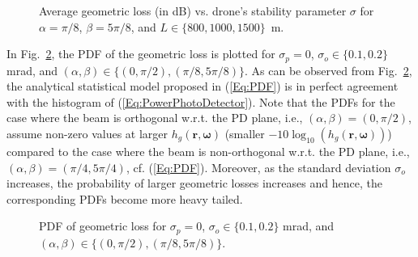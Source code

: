 \documentclass[conference]{IEEEtran}
\begin{document}
 
\begin{figure}
  \centering
\vspace{-8mm}
\caption{Average geometric loss (in dB) vs. drone's stability parameter $\sigma$ for $\alpha=\pi/8$, $\beta=5\pi/8$,  and  $L\in\{800,1000,1500\}$~m.  } \vspace{-2mm}
\label{Fig:Stat}
\end{figure}


 In Fig.~\ref{Fig:PDF}, the PDF of the geometric loss is plotted for $\sigma_p=0$, $\sigma_o\in\{0.1,0.2\}$ mrad, and $(\alpha,\beta)\in\{(0,\pi/2),(\pi/8,5\pi/8)\}$. As can be observed from Fig.~\ref{Fig:PDF}, the  analytical statistical model proposed in (\ref{Eq:PDF}) is in perfect agreement with the histogram of (\ref{Eq:PowerPhotoDetector}). Note that the PDFs for the case where the beam is orthogonal w.r.t. the PD plane, i.e., $(\alpha,\beta)=(0,\pi/2)$, assume non-zero values at larger $h_g(\mathbf{r},\boldsymbol{\omega})$ (smaller $-10\log_{10}(h_g(\mathbf{r},\boldsymbol{\omega}))$) compared to the case where the beam is non-orthogonal w.r.t. the PD plane, i.e.,  $(\alpha,\beta)=(\pi/4,5\pi/4)$, cf. (\ref{Eq:PDF}). Moreover, as the standard deviation $\sigma_o$ increases, the probability of larger geometric losses increases and hence, the corresponding PDFs become more heavy tailed.

\begin{figure}
  \centering
\vspace{-8mm}
\caption{PDF of geometric loss for $\sigma_p=0$, $\sigma_o\in\{0.1,0.2\}$ mrad, and $(\alpha,\beta)\in\{(0,\pi/2),(\pi/8,5\pi/8)\}$.  } \vspace{-2mm}
\label{Fig:PDF}
\end{figure}
\end{document}
